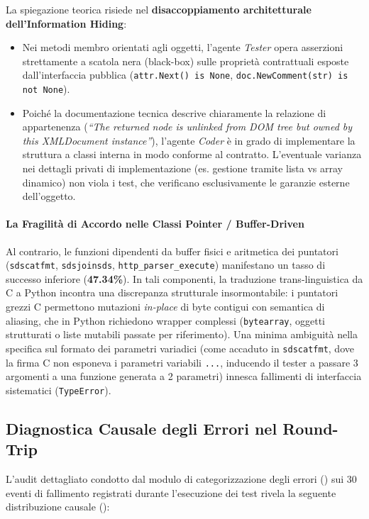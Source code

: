 La spiegazione teorica risiede nel \textbf{disaccoppiamento architetturale dell'Information Hiding}:
\begin{itemize}
    \item Nei metodi membro orientati agli oggetti, l'agente \emph{Tester} opera asserzioni strettamente a scatola nera (black-box) sulle proprietà contrattuali esposte dall'interfaccia pubblica (\texttt{attr.Next() is None}, \texttt{doc.NewComment(str) is not None}).
    \item Poiché la documentazione tecnica descrive chiaramente la relazione di appartenenza (\emph{``The returned node is unlinked from DOM tree but owned by this XMLDocument instance''}), l'agente \emph{Coder} è in grado di implementare la struttura a classi interna in modo conforme al contratto. L'eventuale varianza nei dettagli privati di implementazione (es. gestione tramite lista vs array dinamico) non viola i test, che verificano esclusivamente le garanzie esterne dell'oggetto.
\end{itemize}

\paragraph{La Fragilità di Accordo nelle Classi Pointer / Buffer-Driven}
Al contrario, le funzioni dipendenti da buffer fisici e aritmetica dei puntatori (\texttt{sdscatfmt}, \texttt{sdsjoinsds}, \texttt{http\_parser\_execute}) manifestano un tasso di successo inferiore (\textbf{47.34\%}).
In tali componenti, la traduzione trans-linguistica da C a Python incontra una discrepanza strutturale insormontabile: i puntatori grezzi C permettono mutazioni \emph{in-place} di byte contigui con semantica di aliasing, che in Python richiedono wrapper complessi (\texttt{bytearray}, oggetti strutturati o liste mutabili passate per riferimento). Una minima ambiguità nella specifica sul formato dei parametri variadici (come accaduto in \texttt{sdscatfmt}, dove la firma C non esponeva i parametri variabili \texttt{...}, inducendo il tester a passare 3 argomenti a una funzione generata a 2 parametri) innesca fallimenti di interfaccia sistematici (\texttt{TypeError}).

\subsection{Diagnostica Causale degli Errori nel Round-Trip}
L'audit dettagliato condotto dal modulo di categorizzazione degli errori () sui 30 eventi di fallimento registrati durante l'esecuzione dei test rivela la seguente distribuzione causale ():

